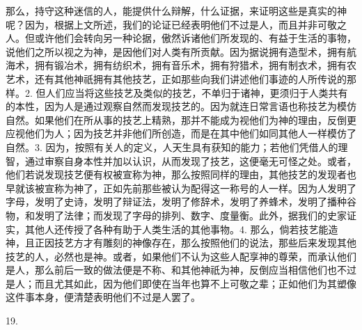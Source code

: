 那么，持守这种迷信的人，能提供什么辩解，什么证据，来证明这些是真实的神呢？因为，根据上文所述，我们的论证已经表明他们不过是人，而且并非可敬之人。但或许他们会转向另一种论据，傲然诉诸他们所发现的、有益于生活的事物，说他们之所以视之为神，是因他们对人类有所贡献。因为据说拥有造型术，拥有航海术，拥有锻冶术，拥有纺织术，拥有音乐术，拥有狩猎术，拥有制衣术，拥有农艺术，还有其他神祇拥有其他技艺，正如那些向我们讲述他们事迹的人所传说的那样。\newline{}2. 但人们应当将这些技艺及类似的技艺，不单归于诸神，更须归于人类共有的本性，因为人是通过观察自然而发现技艺的。因为就连日常言语也称技艺为模仿自然。如果他们在所从事的技艺上精熟，那并不能成为视他们为神的理由，反倒更应视他们为人；因为技艺并非他们所创造，而是在其中他们如同其他人一样模仿了自然。\newline{}3. 因为，按照有关人的定义，人天生具有获知的能力；若他们凭借人的理智，通过审察自身本性并加以认识，从而发现了技艺，这便毫无可怪之处。或者，他们若说发现技艺便有权被宣称为神，那么按照同样的理由，其他技艺的发现者也早就该被宣称为神了，正如先前那些被认为配得这一称号的人一样。因为人发明了字母，发明了史诗，发明了辩证法，发明了修辞术，发明了养蜂术，发明了播种谷物，和发明了法律；而发现了字母的排列、数字、度量衡。此外，据我们的史家证实，其他人还传授了各种有助于人类生活的其他事物。\newline{}4. 那么，倘若技艺能造神，且正因技艺方才有雕刻的神像存在，那么按照他们的说法，那些后来发现其他技艺的人，必然也是神。或者，如果他们不认为这些人配享神的尊荣，而承认他们是人，那么前后一致的做法便是不称、和其他神祇为神，反倒应当相信他们也不过是人；而且尤其如此，因为他们即使在当年也算不上可敬之辈；正如他们为其塑像这件事本身，便清楚表明他们不过是人罢了。\par

19. \par

